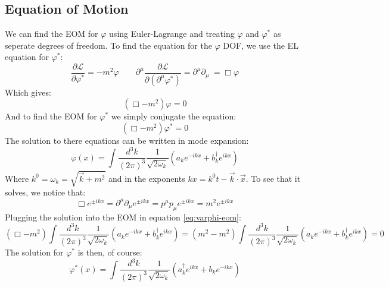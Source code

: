 \documentclass{article}
\begin{document}
\subsection{Equation of Motion}
We can find the EOM for $\varphi$ using Euler-Lagrange and treating $\varphi$ and $\varphi^*$ as seperate degrees of freedom. To find the equation for the $\varphi$ DOF, we use the EL equation for $\varphi^*$:
\begin{equation}
    \frac{\partial \mathcal{L}}{\partial\varphi^*} = -m^2\varphi
    \qquad
    \partial^\mu \frac{\partial \mathcal{L}}{\partial\left(\partial^\mu \varphi^*\right)} = \partial^\mu\partial_\mu\ = \Box \varphi
\end{equation}
Which gives:
\begin{equation}
\label{eq:varphi-eom}
    \left(\Box - m^2\right)\varphi = 0
\end{equation}
And to find the EOM for $\varphi^*$ we simply conjugate the equation:
\begin{equation}
    \left(\Box - m^2\right)\varphi^* = 0
\end{equation}
The solution to there equations can be written in mode expansion:
\begin{equation}
    \varphi(x) = \int \frac{d^3k}{(2\pi)^3}\frac{1}{\sqrt{2\omega_k}}\left(
        a_k e^{-ikx} + b_k^\dagger e^{ikx}
    \right)
\end{equation}
Where $k^0 = \omega_k = \sqrt{\vec{k} + m^2}$ and in the exponents $kx = k^0t - \vec{k}\cdot\vec{x}$. To see that it solves, we notice that:
\begin{equation}
    \Box e^{\pm ikx} = \partial^\mu\partial_\mu e^{\pm ikx} = p^\mu p_\mu e^{\pm ikx} = m^2 e^{\pm ikx}
\end{equation}
Plugging the solution into the EOM in equation \ref{eq:varphi-eom}:
\begin{equation}
    \left(\Box - m^2\right)\int \frac{d^3k}{(2\pi)^3}\frac{1}{\sqrt{2\omega_k}}\left(
        a_k e^{-ikx} + b_k^\dagger e^{ikx}
    \right) = 
    \left(m^2 - m^2\right)\int \frac{d^3k}{(2\pi)^3}\frac{1}{\sqrt{2\omega_k}}\left(
        a_k e^{-ikx} + b_k^\dagger e^{ikx}
    \right) = 0
\end{equation}
The solution for $\varphi^*$ is then, of course:
\begin{equation}
    \varphi^*(x) = \int \frac{d^3k}{(2\pi)^3}\frac{1}{\sqrt{2\omega_k}}\left(
        a_k^\dagger e^{ikx} + b_k e^{-ikx}
    \right)
\end{equation}
\end{document}

